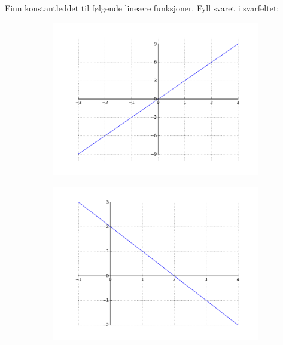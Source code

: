 \documentclass[12pt,twoside,onecolumn]{article}
\begin{document}
\newpage
\begin{Exercise}
Finn konstantleddet til følgende lineære funksjoner. Fyll svaret i svarfeltet:
\begin{figure}[h!]
\centering
    \begin{subfigure}{.5\textwidth}
    \centering
    \includegraphics[scale = 0.5]{figures/3X.png}
    \end{subfigure}%
    \begin{subfigure}{.5\textwidth}
    \centering
    \includegraphics[scale = 0.5]{figures/mXp2.png}
    \end{subfigure}
    \begin{subfigure}{.5\textwidth}
    \centering

\end{subfigure}
\end{figure}
\end{Exercise}
\end{document}
